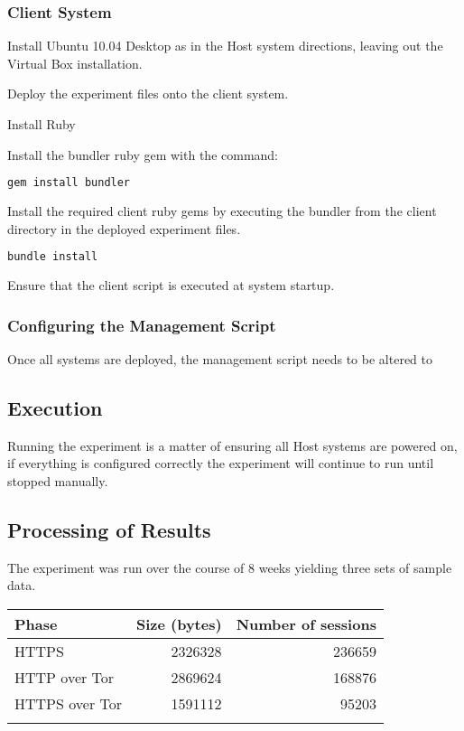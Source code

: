 \subsubsection{Client System}

Install Ubuntu 10.04 Desktop as in the Host system directions, leaving out the
Virtual Box installation.

\begin{enumerate*}
  \item Deploy the experiment files onto the client system.
  \item Install Ruby
  \item Install the bundler ruby gem with the command:
    \begin{lstlisting}[language=sh]
gem install bundler
    \end{lstlisting}
  \item Install the required client ruby gems by executing the bundler from the client directory in the deployed experiment files.
    \begin{lstlisting}[language=sh]
bundle install
    \end{lstlisting}
  \item Ensure that the client script is executed at system startup.
\end{enumerate*}

\subsubsection{Configuring the Management Script}

Once all systems are deployed, the management script needs to be altered to

\subsection{Execution}

Running the experiment is a matter of ensuring all Host systems are powered on,
if everything is configured correctly the experiment will continue to run until
stopped manually.

\subsection{Processing of Results}

The experiment was run over the course of 8 weeks yielding three sets of sample
data.

\begin{tabular}{lrr}
  \toprule
  Phase & Size (bytes) & Number of sessions\\
  \midrule
  HTTPS & 2326328 & 236659\\
  HTTP over Tor & 2869624 & 168876\\
  HTTPS over Tor & 1591112 & 95203\\
  \bottomrule
  \label{table:datasets}
\end{tabular}

